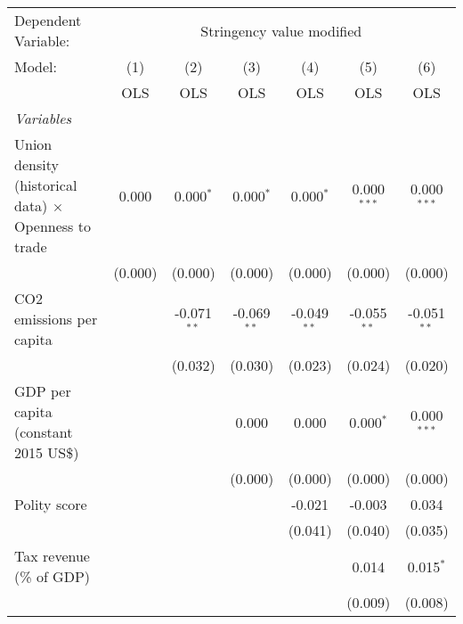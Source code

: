 
\begingroup
\centering
\begin{tabular}{lcccccc}
   \toprule
   Dependent Variable: & \multicolumn{6}{c}{Stringency value modified}\\
   Model:                                                      & (1)     & (2)           & (3)           & (4)           & (5)           & (6)\\  
                                                               &  OLS    & OLS           & OLS           & OLS           & OLS           & OLS\\  
   \midrule
   \emph{Variables}\\
   Union density (historical data) $\times$ Openness to trade  & 0.000   & 0.000$^{*}$   & 0.000$^{*}$   & 0.000$^{*}$   & 0.000$^{***}$ & 0.000$^{***}$\\   
                                                               & (0.000) & (0.000)       & (0.000)       & (0.000)       & (0.000)       & (0.000)\\   
   CO2 emissions per capita                                    &         & -0.071$^{**}$ & -0.069$^{**}$ & -0.049$^{**}$ & -0.055$^{**}$ & -0.051$^{**}$\\   
                                                               &         & (0.032)       & (0.030)       & (0.023)       & (0.024)       & (0.020)\\   
   GDP per capita (constant 2015 US\$)                         &         &               & 0.000         & 0.000         & 0.000$^{*}$   & 0.000$^{***}$\\   
                                                               &         &               & (0.000)       & (0.000)       & (0.000)       & (0.000)\\   
   Polity score                                                &         &               &               & -0.021        & -0.003        & 0.034\\   
                                                               &         &               &               & (0.041)       & (0.040)       & (0.035)\\   
   Tax revenue (\% of GDP)                                     &         &               &               &               & 0.014         & 0.015$^{*}$\\   
                                                               &         &               &               &               & (0.009)       & (0.008)\\   

\end{tabular}
